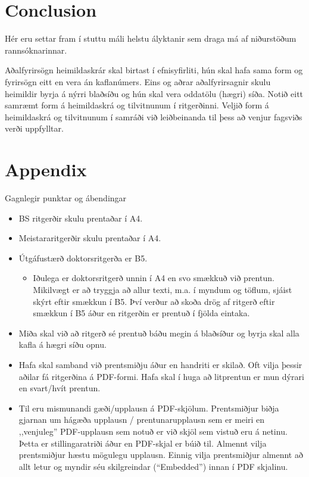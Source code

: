 \documentclass[a4paper,12pt,twoside,BCOR=10mm]{scrbook}
\begin{document}
\chapter{Conclusion}
Hér eru settar fram í stuttu máli helstu ályktanir sem draga má af niðurstöðum rannsóknarinnar.

%
%
\printbibliography[heading=bibintoc] %

Aðalfyrirsögn heimildaskrár skal birtast í efnisyfirliti, hún skal hafa sama form og fyrirsögn eitt en vera án kaflanúmers. Eins og aðrar aðalfyrirsagnir skulu heimildir byrja á nýrri blaðsíðu og hún skal vera oddatölu (hægri) síða.
Notið eitt samræmt form á heimildaskrá og tilvitnunum í ritgerðinni. Veljið form á heimildaskrá og tilvitnunum í samráði við leiðbeinanda til þess að venjur fagsviðs verði uppfylltar.


%
%
\appendix
\chapter{Appendix}
Gagnlegir punktar og ábendingar
\begin{itemize}
 \item BS ritgerðir skulu prentaðar í A4.
 \item Meistararitgerðir skulu prentaðar í A4.
 \item Útgáfustærð doktorsritgerða er B5.
\begin{itemize}
 \item[-] Iðulega er doktorsritgerð unnin í A4 en svo smækkuð við prentun. Mikilvægt er að tryggja að allur texti, m.a. í myndum og töflum, sjáist skýrt eftir smækkun í B5. Því verður að skoða drög af ritgerð eftir smækkun í B5 áður en ritgerðin er prentuð í fjölda eintaka.
\end{itemize}

\end{itemize}

\begin{itemize}
 \item Miða skal við að ritgerð sé prentuð báðu megin á blaðsíður og byrja skal alla kafla á hægri síðu opnu.
 \item Hafa skal samband við prentsmiðju áður en handriti er skilað. Oft vilja þessir aðilar fá ritgerðina á PDF-formi. Hafa skal í huga að litprentun er mun dýrari en svart/hvít prentun. 
 \item Til eru mismunandi gæði/upplausn á PDF-skjölum. Prentsmiðjur biðja gjarnan um hágæða upplausn / prentunarupplausn sem er meiri en ,,venjuleg” PDF-upplausn sem notuð er við skjöl sem vistuð eru á netinu. Þetta er stillingaratriði áður en PDF-skjal er búið til. Almennt vilja prentsmiðjur hæstu mögulegu upplausn. Einnig vilja prentsmiðjur almennt að allt letur og myndir séu skilgreindar (“Embedded”) innan í PDF skjalinu.
\end{itemize}
\end{document}
